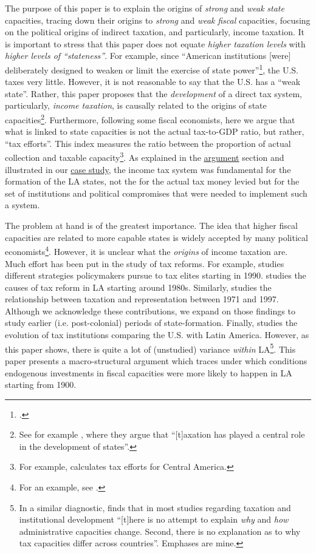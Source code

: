 \documentclass[onesided]{article}\usepackage[]{graphicx}\usepackage[]{color}
\begin{document}
The purpose of this paper is to explain the origins of \emph{strong} and \emph{weak} \emph{state} capacities, tracing down their origins to \emph{strong} and \emph{weak} \emph{fiscal} capacities, focusing on the political origins of indirect taxation, and particularly, income taxation. It is important to stress that this paper does not equate  \emph{higher taxation levels} with \emph{higher levels of ``stateness''}. For example, since ``American institutions [were] deliberately designed to weaken or limit the exercise of state power''\footnote{\citet[p. 6]{Fukuyama:2004nr}.}, the U.S. taxes very little. However, it is not reasonable to say that the U.S. has a ``weak state''. Rather, this paper proposes that the \emph{development} of a direct tax system, particularly, \emph{income taxation}, is causally related to the origins of state capacities\footnote{
	See for example \citet[p. 117]{Besley2014}, where they argue that ``[t]axation has played a central role in the development of states''.
}. Furthermore, following some fiscal economists, here we argue that what is linked to state capacities is not the actual tax-to-GDP ratio, but rather, ``tax efforts''. This index measures the ratio between the proportion of actual collection and taxable capacity\footnote{
	For example, \citet[p. 54]{Best1976} calculates tax efforts for Central America.
}. As explained in the \hyperref[argument]{argument} section and illustrated in our \hyperref[unpacking]{case study}, the income tax system was fundamental for the formation of the LA states, not the for the actual tax money levied  but for the set of institutions and political compromises that were needed to implement such a system.
  

The problem at hand is of the greatest importance. The idea that higher fiscal capacities are related to more capable states is widely accepted by many political economists\footnote{For an example, see \citet[]{Besley:2011aa}.}. However, it is unclear what the \emph{origins} of income taxation are. Much effort has been put in the study of tax reforms. For example,  \citet[]{Fairfield2013} studies different strategies policymakers pursue to tax elites starting in 1990. \citet[]{Mahon2004} studies the causes of tax reform in LA starting around 1980s. Similarly, \citet[]{Ross2004} studies the relationship between taxation and representation between 1971 and 1997. Although we acknowledge these contributions, we expand on those findings to study earlier (i.e. post-colonial) periods of state-formation. Finally, \citet{Sokoloff2007a} studies the evolution of tax institutions comparing the U.S. with Latin America. However, as this paper shows, there is quite a lot of (unstudied) variance \emph{within} LA\footnote{
	In a similar diagnostic, \citet[p. 5]{DiJohn2006} finds that in most studies regarding taxation and institutional development ``[t]here is no attempt to explain \emph{why} and \emph{how} administrative capacities change. Second, there is no explanation as to why tax capacities differ across countries''. Emphases are mine.
	}. This paper presents a macro-structural argument which traces under which conditions endogenous investments in fiscal capacities were more likely to happen in LA starting from 1900. 
\end{document}
